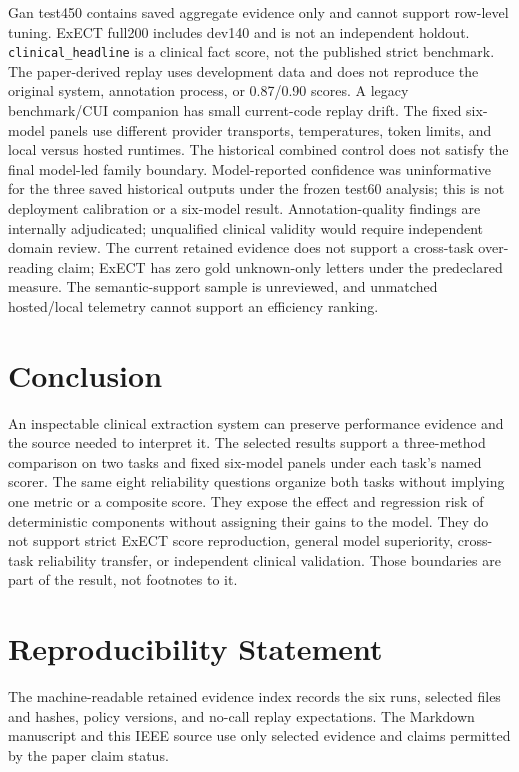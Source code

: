 \documentclass[conference]{IEEEtran}
\newcommand{\code}[1]{\texttt{#1}}
\begin{document}
Gan test450 contains saved aggregate evidence only and cannot support row-level tuning.
ExECT full200 includes dev140 and is not an independent holdout.
\code{clinical\_headline} is a clinical fact score, not the published
strict benchmark. The paper-derived replay uses development data and does not
reproduce the original system, annotation process, or 0.87/0.90 scores. A
legacy benchmark/CUI companion has small current-code replay drift. The fixed
six-model panels use different provider transports, temperatures, token limits,
and local versus hosted runtimes. The historical combined control does not
satisfy the final model-led family boundary.
Model-reported confidence was uninformative for the three saved historical
outputs under the frozen test60 analysis; this is not deployment calibration
or a six-model result. Annotation-quality findings are internally adjudicated; unqualified
clinical validity would require independent domain review. The current retained
evidence does not support a cross-task over-reading claim; ExECT has zero gold
unknown-only letters under the predeclared measure. The semantic-support sample
is unreviewed, and unmatched hosted/local telemetry cannot support an efficiency
ranking.

\section{Conclusion}

An inspectable clinical extraction system can preserve performance evidence
and the source needed to interpret it. The selected results support a
three-method comparison on two tasks and fixed six-model panels under each
task's named scorer. The same eight reliability questions organize both tasks
without implying one metric or a composite score. They expose the effect and
regression risk of deterministic components without assigning their gains to
the model. They do not support strict ExECT score reproduction, general model
superiority, cross-task reliability transfer, or independent clinical
validation. Those boundaries are part of the result, not footnotes to it.

\section*{Reproducibility Statement}

The machine-readable retained evidence index records the six runs, selected
files and hashes, policy versions, and no-call replay expectations. The
Markdown manuscript and this IEEE source use only selected evidence and claims
permitted by the paper claim status.
\end{document}
